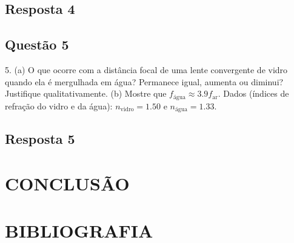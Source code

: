 \documentclass[12pt]{article} %
\begin{document}
	\subsection*{Resposta 4}
	
	
	
	\subsection*{Questão 5}
	
	5. (a) O que ocorre com a distância focal de uma lente convergente de vidro quando ela é mergulhada em água? Permanece igual, aumenta ou diminui? Justifique qualitativamente. (b) Mostre que $f_\text{água} \approx 3.9 f_\text{ar}$. Dados (índices de refração do vidro e da água): $n_\text{vidro} = 1.50$ e $n_\text{água} = 1.33$.
	
	\subsection*{Resposta 5}
	
	
	
	\section{CONCLUSÃO}
	
	
	\vfill
	
	\section{BIBLIOGRAFIA}
	
	\printbibliography[heading=none]
	
	
\end{document}
